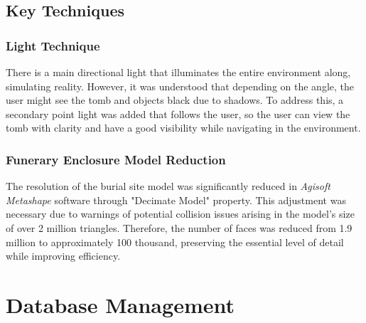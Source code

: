 \subsection{Key Techniques}
\subsubsection{Light Technique}
There is a main directional light that illuminates the entire environment along, simulating reality. However, it was understood that depending on the angle, the user might see the tomb and objects black due to shadows. To address this, a secondary point light was added that follows the user, so the user can view the tomb with clarity and have a good visibility while navigating in the environment.

\subsubsection{Funerary Enclosure Model Reduction}
The resolution of the burial site model was significantly reduced in \emph{Agisoft Metashape} software through "Decimate Model" property.
This adjustment was necessary due to warnings of potential collision issues arising in the model's size of over 2 million triangles. 
Therefore, the number of faces was reduced from 1.9 million to approximately 100 thousand, preserving the essential level of detail while improving efficiency.


\section{Database Management}
